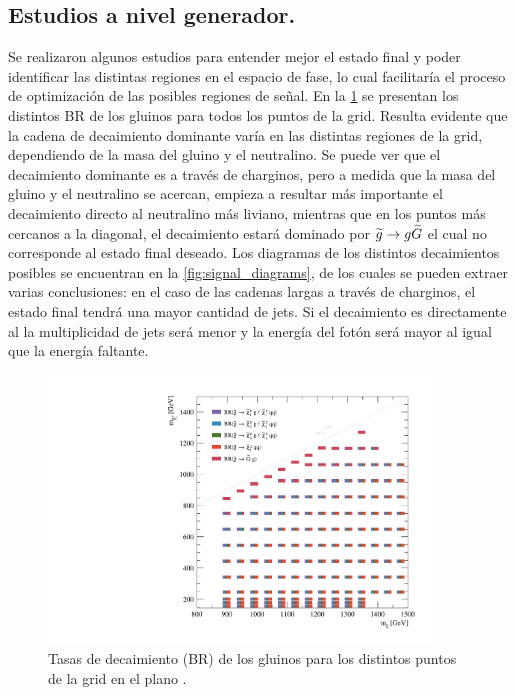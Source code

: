 \subsection{Estudios a nivel generador.} %
\label{sec:susy_studies}

Se realizaron algunos estudios para entender mejor el estado final y poder
identificar las distintas regiones en el espacio de fase, lo cual facilitaría el
proceso de optimización de las posibles regiones de se\~nal. En la
\cref{fig:signal_br_gl} se presentan los distintos BR de los gluinos para todos
los puntos de la grid. Resulta evidente que la cadena de decaimiento dominante
varía en las distintas regiones de la grid, dependiendo de la masa del gluino y
el neutralino. Se puede ver que el decaimiento dominante es a través de
charginos, pero a medida que la masa del gluino y el neutralino se acercan,
empieza a resultar más importante el decaimiento directo al neutralino más
liviano, mientras que en los puntos más cercanos a la diagonal, el decaimiento
estará dominado por $\widetilde{g}\rightarrow g\widetilde{G}$ el cual no corresponde al estado
final deseado. Los diagramas de los distintos decaimientos posibles se encuentran
en la \cref{fig:signal_diagrams}, de los cuales se pueden extraer varias
conclusiones: en el caso de las cadenas largas a través de charginos, el estado
final tendrá una mayor cantidad de jets. Si el decaimiento es directamente al
{\ninoone} la multiplicidad de jets será menor y la energía del fotón será mayor
al igual que la energía faltante.


\begin{figure}[!htb]
  \centering

  \includegraphics[width=0.9\textwidth]{figures/br_gl_X}

  \caption{Tasas de decaimiento (BR) de los gluinos para los distintos puntos de la grid en
    el plano \mgmn.}
  \label{fig:signal_br_gl}
\end{figure}



